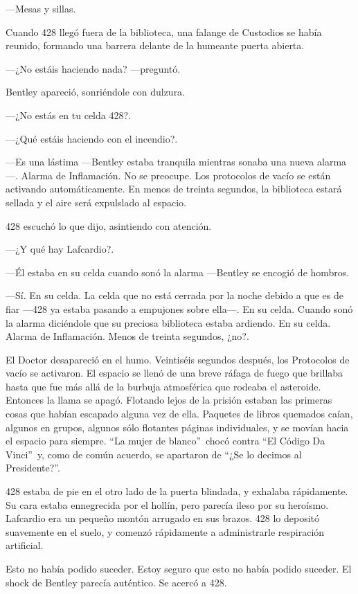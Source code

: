 ---Mesas y sillas.

Cuando 428 llegó fuera de la biblioteca, una falange de Custodios se
había reunido, formando una barrera delante de la humeante puerta
abierta.

---¿No estáis haciendo nada? ---preguntó.

Bentley apareció, sonriéndole con dulzura.

---¿No estás en tu celda 428?.

---¿Qué estáis haciendo con el incendio?.

---Es una lástima ---Bentley estaba tranquila mientras sonaba una nueva
alarma---. Alarma de Inflamación. No se preocupe. Los protocolos de
vacío se están activando automáticamente. En menos de treinta segundos,
la biblioteca estará sellada y el aire será expulslado al espacio.

428 escuchó lo que dijo, asintiendo con atención.

---¿Y qué hay Lafcardio?.

---Él estaba en su celda cuando sonó la alarma ---Bentley se encogió de
hombros.

---Sí. En su celda. La celda que no está cerrada por la noche debido a
que es de fiar ---428 ya estaba pasando a empujones sobre ella---. En su
celda. Cuando sonó la alarma diciéndole que su preciosa biblioteca
estaba ardiendo. En su celda. Alarma de Inflamación. Menos de treinta
segundos, ¿no?.

El Doctor desapareció en el humo. Veintiséis segundos después, los
Protocolos de vacío se activaron. El espacio se llenó de una breve
ráfaga de fuego que brillaba hasta que fue más allá de la burbuja
atmosférica que rodeaba el asteroide. Entonces la llama se apagó.
Flotando lejos de la prisión estaban las primeras cosas que habían
escapado alguna vez de ella. Paquetes de libros quemados caían, algunos
en grupos, algunos sólo flotantes páginas individuales, y se movían
hacia el espacio para siempre. ``La mujer de blanco''~chocó contra ``El
Código Da Vinci''~y, como de común acuerdo, se apartaron de ``¿Se lo
decimos al Presidente?''.

428 estaba de pie en el otro lado de la puerta blindada, y exhalaba
rápidamente. Su cara estaba ennegrecida por el hollín, pero parecía
ileso por su heroísmo. Lafcardio era un pequeño montón arrugado en sus
brazos. 428 lo depositó suavemente en el suelo, y comenzó rápidamente a
administrarle respiración artificial.

Esto no había podido suceder. Estoy seguro que esto no había podido
suceder. El shock de Bentley parecía auténtico. Se acercó a 428.

